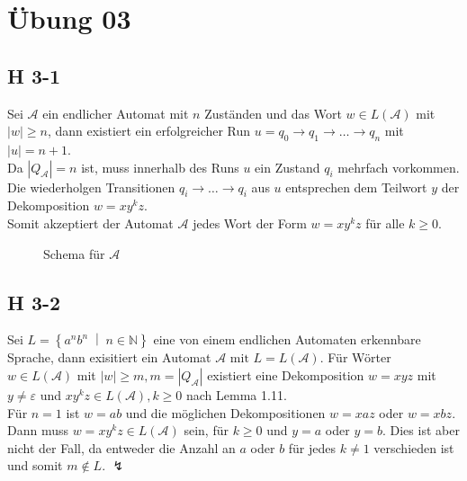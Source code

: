 \documentclass{scrartcl}
\begin{document}
\section{Übung 03}

\subsection{H 3-1}

Sei $\mathcal{A}$ ein endlicher Automat mit $n$ Zuständen und das Wort $w \in L(\mathcal{A})$ mit $|w| \geq n$, dann existiert ein erfolgreicher Run $u = q_0 \rightarrow q_1 \rightarrow \ldots \rightarrow q_n$ mit $|u| = n+1$.\\
Da $|Q_\mathcal{A}| = n$ ist, muss innerhalb des Runs $u$ ein Zustand $q_i$ mehrfach vorkommen. Die wiederholgen Transitionen $q_i \rightarrow \ldots \rightarrow q_i$ aus $u$ entsprechen dem Teilwort $y$ der Dekomposition $w = xy^kz$.\\
Somit akzeptiert der Automat $\mathcal{A}$ jedes Wort der Form $w = xy^kz$ für alle $k \geq 0$.

\begin{figure}[ht]
\centering
{}
\caption*{Schema für $\mathcal{A}$}
\end{figure}

\subsection{H 3-2}

Sei $L = \left\{ a^nb^n\;\middle|\;n \in \mathbb{N} \right\}$ eine von einem endlichen Automaten erkennbare Sprache, dann exisitiert ein Automat $\mathcal{A} \text{ mit } L = L(\mathcal{A})$.
Für Wörter $w \in L(\mathcal{A})$ mit $|w| \geq m, m = |Q_\mathcal{A}|$ existiert eine Dekomposition $w = xyz$ mit $y\neq\varepsilon$ und $xy^kz \in L(\mathcal{A}), k \geq 0$ nach Lemma 1.11.\\
Für $n = 1$ ist $w = ab$ und die möglichen Dekompositionen $w=xaz$ oder $w=xbz$. Dann muss $w=xy^kz \in L(\mathcal{A})$ sein, für $k \geq 0$ und $y=a$ oder $y=b$. Dies ist aber nicht der Fall, da entweder die Anzahl an $a$ oder $b$ für jedes $k\neq1$ verschieden ist und somit $m\not\in L$. \hfill$\lightning$
\end{document}
